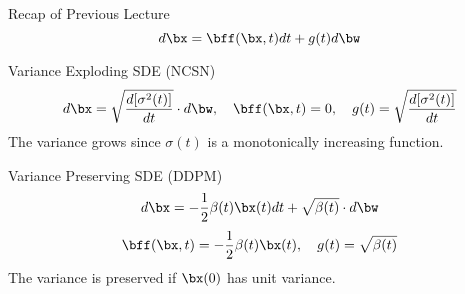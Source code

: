 \documentclass{beamer}
\begin{document}
\begin{frame}
\titlepage
	\resetonslide
\end{frame}
\begin{frame}{Recap of Previous Lecture}
	\vspace{-0.3cm}
	\[
		d\bx = \bff(\bx, t) dt + g(t) d \bw
	\]
	\vspace{-0.3cm}
	\begin{block}{Variance Exploding SDE (NCSN)}
		\vspace{-0.5cm}
		\[
			d \bx = \sqrt{\frac{ d [\sigma^2(t)]}{dt}} \cdot d \bw, \quad \bff(\bx, t) = 0, \quad g(t) = \sqrt{\frac{ d [\sigma^2(t)]}{dt}} 
		\]
		The variance grows since $\sigma(t)$ is a monotonically increasing function.
	\end{block}
	\begin{block}{Variance Preserving SDE (DDPM)}
		\vspace{-0.3cm}
		\[
			d \bx = - \frac{1}{2} \beta(t) \bx(t) dt + \sqrt{\beta(t)} \cdot d \bw
		\]
		\[
			\bff(\bx, t) = - \frac{1}{2} \beta(t) \bx(t) , \quad g(t) = \sqrt{\beta(t)} 
		\]
		The variance is preserved if $\bx(0)$ has unit variance.
	\end{block}
\end{frame}
\end{document}
